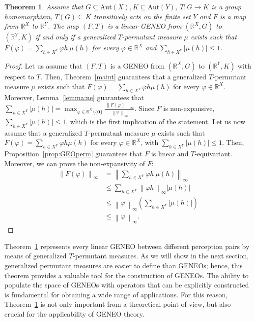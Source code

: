 \documentclass[11pt]{article}
\newcommand{\R}{\mathbb{R}}
\newcommand{\p}{\varphi}
\newtheorem{theorem}{Theorem}[section]
\begin{document}
\begin{theorem}
    \label{teo:linear}
    Assume that $G \subseteq \mathrm{Aut}(X), K \subseteq \mathrm{Aut}(Y)$, $T \colon G \to K$ is a group homomorphism, $T(G) \subseteq K$ transitively acts on the finite set $Y$ and $F$ is a map from $\mathbb{R}^X$ to $\mathbb{R}^Y$. The map $(F,T)$ is a linear GENEO from $(\mathbb{R}^X, G)$ to $(\mathbb{R}^Y, K)$ if and only if a generalized $T$-permutant measure $\mu$ exists such that $F(\varphi) = \sum_{h \in X^Y} \varphi h \ \mu(h)$ for every $\varphi \in \mathbb{R}^X$ and $\sum_{h \in X^Y} \left| \mu(h) \right| \le 1$.
\end{theorem}

\begin{proof}
    Let us assume that $(F,T)$ is a GENEO from $\left( \R^X, G \right)$ to $\left( \R^Y, K \right)$ with respect to $T$. Then, Theorem~\ref{maint} guarantees that a generalized $T$-permutant measure $\mu$ exists such that $F(\p) = \sum_{h \in X^Y} \p h \mu(h)$ for every $\p \in \R^X$. Moreover, Lemma~\ref{lemma:ne} guarantees that $\sum_{h \in X^Y} \left| \mu(h) \right| = \max_{\varphi \in \R^X \setminus \{\mathbf{0}\}} \frac{\left\| F(\p) \right\|_\infty}{\left\| \p \right\|_\infty}$. Since $F$ is non-expansive, $\sum_{h \in X^Y} \left| \mu(h) \right| \le 1$, which is the first implication of the statement. Let us now assume that a generalized $T$-permutant measure $\mu$ exists such that $F(\p) = \sum_{h \in X^Y} \p h \mu(h)$ for every $\p \in \R^X$, with $\sum_{h \in X^Y} \left| \mu(h) \right| \le 1$. Then, Proposition~\ref{prop:GEOperm} guarantees that $F$ is linear and $T$-equivariant. Moreover, we can prove the non-expansivity of $F$:
    \begin{align*}
        \left\| F(\p) \right\|_\infty & = \left\| \sum_{h \in X^Y} \p h \ \mu(h) \right\|_\infty \\
        & \le \sum_{h \in X^Y} \left\| \p h \right\|_\infty \left| \mu(h) \right| \\
        & \le \left\| \p \right\|_\infty \left( \sum_{h \in X^Y} \left| \mu(h) \right| \right) \\
        & \le \left\| \p \right\|_\infty.
    \end{align*}
\end{proof}

Theorem~\ref{teo:linear} represents every linear GENEO between different
perception pairs by means of generalized $T$-permutant measures. As we will show in
the next section, generalized permutant measures are easier to define than
GENEOs; hence, this theorem provides a valuable tool for the construction of
GENEOs. The ability to populate the space of GENEOs with operators that can be
explicitly constructed is fundamental for obtaining a wide range of
applications. For this reason, Theorem~\ref{teo:linear} is not only important
from a theoretical point of view, but also crucial for the applicability of
GENEO theory.
\end{document}
